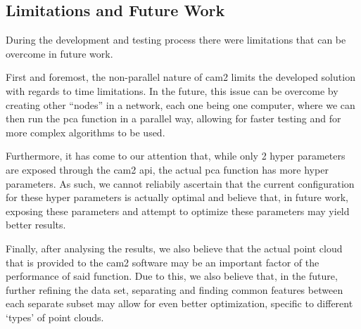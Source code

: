
\subsection{Limitations and Future Work}
\label{sec:futurework}

During the development and testing process there were limitations that can be overcome in future work.

First and foremost, the non-parallel nature of \acrshort{cam2} limits the developed solution with regards to time limitations. In the future, this issue can be overcome by creating other ``nodes'' in a network, each one being one computer, where we can then run the \acrshort{pca} function in a parallel way, allowing for faster testing and for more complex algorithms to be used.

Furthermore, it has come to our attention that, while only 2 hyper parameters are exposed through the \acrshort{cam2} \acrshort{api}, the actual \acrshort{pca} function has more hyper parameters. As such, we cannot reliabily ascertain that the current configuration for these hyper parameters is actually optimal and believe that, in future work, exposing these parameters and attempt to optimize these parameters may yield better results.

Finally, after analysing the results, we also believe that the actual point cloud that is provided to the \acrshort{cam2} software may be an important factor of the performance of said function. Due to this, we also believe that, in the future, further refining the data set, separating and finding common features between each separate subset may allow for even better optimization, specific to different `types' of point clouds.